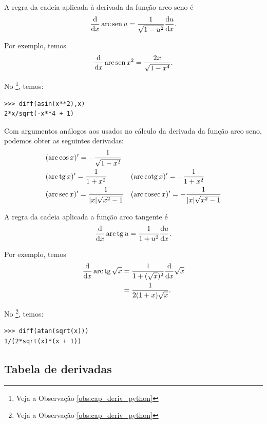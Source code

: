 \begin{ex}
  A regra da cadeia aplicada à derivada da função arco seno é
  \begin{equation}
    \frac{\mathrm{d}}{\mathrm{d} x}\operatorname{arc}\operatorname{sen} u = \frac{1}{\sqrt{1-u^2}}\frac{\mathrm{d} u}{\mathrm{d} x}.
  \end{equation}

  Por exemplo, temos
  \begin{equation}
    \frac{\mathrm{d}}{\mathrm{d} x}\operatorname{arc}\operatorname{sen} x^2 = \frac{2x}{\sqrt{1-x^4}}.
  \end{equation}

  \ifispython
  No \sympy\footnote{Veja a Observação \ref{obs:cap_deriv_python}}, temos:
\begin{verbatim}
>>> diff(asin(x**2),x)
2*x/sqrt(-x**4 + 1)
\end{verbatim}
  \fi    
\end{ex}

Com argumentos análogos aos usados no cálculo da derivada da função arco seno, podemos obter as seguintes derivadas:
\begin{align}
  & (\operatorname{arc}\cos x)' = -\frac{1}{\sqrt{1-x^2}} && \\
  &(\operatorname{arc}\operatorname{tg} x)' = \frac{1}{1+x^2} && (\operatorname{arc}\operatorname{cotg} x)' = -\frac{1}{1+x^2} \\
  & (\operatorname{arc}\sec x)' = \frac{1}{|x|\sqrt{x^2-1}} && (\operatorname{arc}\operatorname{cosec} x)' = -\frac{1}{|x|\sqrt{x^2-1}}
\end{align}

\begin{ex}
  A regra da cadeia aplicada a função arco tangente é
  \begin{equation}
    \frac{\mathrm{d}}{\mathrm{d} x}\operatorname{arc}\operatorname{tg} u = \frac{1}{1+u^2}\frac{\mathrm{d} u}{\mathrm{d} x}.
  \end{equation}

  Por exemplo, temos
  \begin{align}
    \frac{\mathrm{d}}{\mathrm{d} x}\operatorname{arc}\operatorname{tg}\sqrt{x} &= \frac{1}{1+(\sqrt{x})^2}\frac{\mathrm{d}}{\mathrm{d} x}\sqrt{x} \\
                                     &=  \frac{1}{2(1+x)\sqrt{x}}.
  \end{align}

  \ifispython
  No \sympy\footnote{Veja a Observação \ref{obs:cap_deriv_python}}, temos:
\begin{verbatim}
>>> diff(atan(sqrt(x)))
1/(2*sqrt(x)*(x + 1))
\end{verbatim}
  \fi    
\end{ex}

\subsection{Tabela de derivadas}

